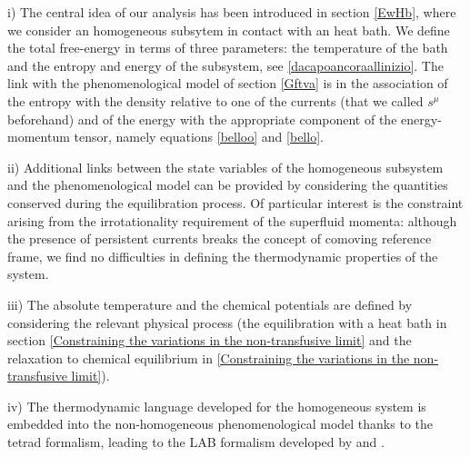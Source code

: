 \documentclass[usenatbib]{mnras}
\begin{document}

i) The central idea of our analysis has been introduced in section \ref{EwHb}, where  we consider an homogeneous subsytem  in contact with an heat bath. We define  the total free-energy in terms of three parameters: the temperature of the bath and the entropy and energy of the subsystem, see \eqref{dacapoancoraallinizio}. 
The link with the phenomenological model of section \ref{Gftva} is in the association of the entropy with the density relative to  one of the currents  (that we called $s^\mu$ beforehand) and of the  energy with the appropriate component of the energy-momentum tensor, namely equations \eqref{belloo} and \eqref{bello}.  

ii) Additional links between the state variables of the homogeneous subsystem and the phenomenological model can be provided by considering the quantities conserved during the equilibration process.
Of particular interest is the constraint arising from the irrotationality requirement of the superfluid momenta: although the presence of persistent  currents breaks the concept of comoving reference frame, we find no difficulties in defining the thermodynamic properties of the system. 

iii) The absolute temperature  and the chemical potentials  are defined by considering the relevant physical process (the equilibration with a heat bath in section \ref{Constraining the variations in the non-transfusive limit} and the relaxation to chemical equilibrium in \ref{Constraining the variations in the non-transfusive limit}).

iv) The thermodynamic language developed for the homogeneous system is embedded into the non-homogeneous phenomenological model thanks to the tetrad formalism, leading to the LAB formalism developed by \cite{Son2001} and \cite{GusakovAndersson2006}.
\end{document}
